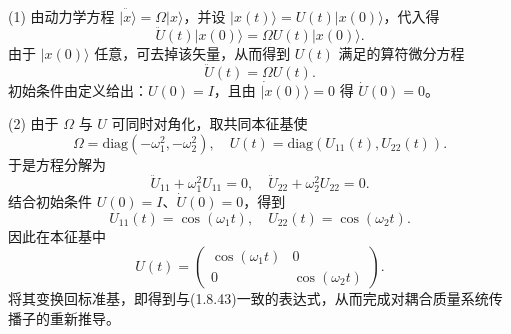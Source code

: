 \begin{solution}[耦合质量问题]

\answer
(1) 由动力学方程 $\ddot{|x\rangle}=\Omega |x\rangle$，并设 $|x(t)\rangle=U(t)|x(0)\rangle$，代入得
\[
\ddot{U}(t)|x(0)\rangle=\Omega U(t)|x(0)\rangle.
\]
由于 $|x(0)\rangle$ 任意，可去掉该矢量，从而得到 $U(t)$ 满足的算符微分方程
\[
\ddot{U}(t)=\Omega U(t).
\]
初始条件由定义给出：$U(0)=I$，且由 $\dot{|x}(0)\rangle=0$ 得 $\dot{U}(0)=0$。

(2) 由于 $\Omega$ 与 $U$ 可同时对角化，取共同本征基使
\[
\Omega=\mathrm{diag}(-\omega_1^2,-\omega_2^2),\quad U(t)=\mathrm{diag}(U_{11}(t),U_{22}(t)).
\]
于是方程分解为
\[
\ddot{U}_{11}+\omega_1^2 U_{11}=0,\quad \ddot{U}_{22}+\omega_2^2 U_{22}=0.
\]
结合初始条件 $U(0)=I$、$\dot{U}(0)=0$，得到
\[
U_{11}(t)=\cos(\omega_1 t),\quad U_{22}(t)=\cos(\omega_2 t).
\]
因此在本征基中
\[
U(t)=\begin{pmatrix}
\cos(\omega_1 t) & 0\\
0 & \cos(\omega_2 t)
\end{pmatrix}.
\]
将其变换回标准基，即得到与(1.8.43)一致的表达式，从而完成对耦合质量系统传播子的重新推导。
\end{solution}